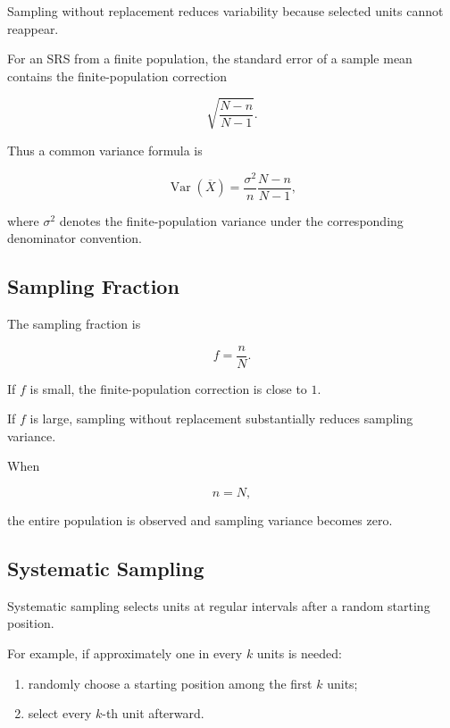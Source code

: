 Sampling without replacement reduces variability because selected units
cannot reappear.

For an SRS from a finite population, the standard error of a sample mean
contains the finite-population correction

\[
\boxed{
\sqrt{
\frac{N-n}{N-1}
}.
}
\]

Thus a common variance formula is

\[
\boxed{
\operatorname{Var}(\overline{X})
=
\frac{\sigma^2}{n}
\frac{N-n}{N-1},
}
\]

where \(\sigma^2\) denotes the finite-population variance under the
corresponding denominator convention.

\subsection{Sampling Fraction}
\label{subsec:sampling-fraction}

The sampling fraction is

\[
\boxed{
f=\frac nN.
}
\]

If \(f\) is small, the finite-population correction is close to \(1\).

If \(f\) is large, sampling without replacement substantially reduces
sampling variance.

When

\[
n=N,
\]

the entire population is observed and sampling variance becomes zero.

\subsection{Systematic Sampling}
\label{subsec:systematic-sampling}

Systematic sampling selects units at regular intervals after a random
starting position.

For example, if approximately one in every \(k\) units is needed:

\begin{enumerate}
    \item randomly choose a starting position among the first \(k\)
          units;
    \item select every \(k\)-th unit afterward.
\end{enumerate}

